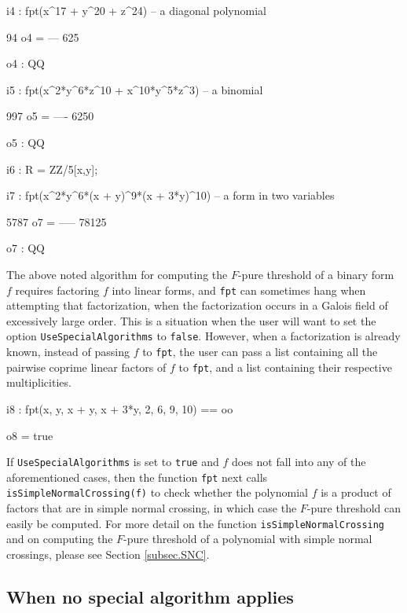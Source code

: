 \documentclass{amsart}
\begin{document}
\bigskip
{\small
{}
\begin{MyVerbatim}
i4 : fpt(x^17 + y^20 + z^24) -- a diagonal polynomial

      94
o4 = ---
     625

o4 : QQ

i5 : fpt(x^2*y^6*z^10 + x^10*y^5*z^3) -- a binomial

      997
o5 = ----
     6250

o5 : QQ

i6 : R = ZZ/5[x,y];

i7 : fpt(x^2*y^6*(x + y)^9*(x + 3*y)^10) -- a form in two variables

      5787
o7 = -----
     78125

o7 : QQ
\end{MyVerbatim}
}
\bigskip

The above noted algorithm for computing the $F$-pure threshold of a binary form $f$ requires factoring $f$ into linear forms, and \texttt{fpt} can sometimes hang when attempting that factorization, when the factorization occurs in a Galois field of excessively large order.
This is a situation when the user will want to set the option \texttt{UseSpecialAlgorithms} to \texttt{false}.
However, when a factorization is already known, instead of passing $f$ to \texttt{fpt}, the user can pass a list containing all the pairwise coprime linear factors of $f$ to \texttt{fpt}, and a list containing their respective multiplicities.


\bigskip
{\small
{}
\begin{MyVerbatim}
i8 : fpt({x, y, x + y, x + 3*y}, {2, 6, 9, 10}) == oo

o8 = true
\end{MyVerbatim}
}
\bigskip

If \texttt{UseSpecialAlgorithms} is set to \texttt{true} and $f$ does not fall into any of the aforementioned cases, then the function \texttt{fpt} next calls \texttt{isSimpleNormalCrossing(f)} to check whether the polynomial $f$ is a product of factors that are in simple normal crossing, in which case the $F$-pure threshold can easily be computed.
For more detail on the function \texttt{isSimpleNormalCrossing} and on computing the $F$-pure threshold of a polynomial with simple normal crossings, please see Section \ref{subsec.SNC}.

\subsection{When no special algorithm applies}
\end{document}
